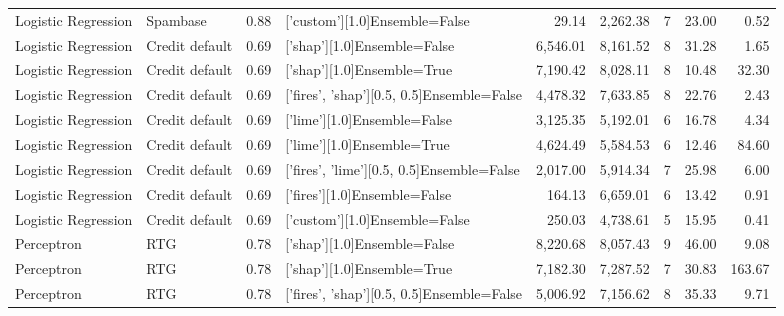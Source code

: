 \begin{tabular}{llrlrrlrr}
Logistic Regression &       Spambase &      0.88 &             ['custom'][1.0]Ensemble=False &      29.14 &                 2,262.38 &               7 &              23.00 &   0.52 \\
Logistic Regression & Credit default &      0.69 &               ['shap'][1.0]Ensemble=False &   6,546.01 &                 8,161.52 &               8 &              31.28 &   1.65 \\
Logistic Regression & Credit default &      0.69 &                ['shap'][1.0]Ensemble=True &   7,190.42 &                 8,028.11 &               8 &              10.48 &  32.30 \\
Logistic Regression & Credit default &      0.69 & ['fires', 'shap'][0.5, 0.5]Ensemble=False &   4,478.32 &                 7,633.85 &               8 &              22.76 &   2.43 \\
Logistic Regression & Credit default &      0.69 &               ['lime'][1.0]Ensemble=False &   3,125.35 &                 5,192.01 &               6 &              16.78 &   4.34 \\
Logistic Regression & Credit default &      0.69 &                ['lime'][1.0]Ensemble=True &   4,624.49 &                 5,584.53 &               6 &              12.46 &  84.60 \\
Logistic Regression & Credit default &      0.69 & ['fires', 'lime'][0.5, 0.5]Ensemble=False &   2,017.00 &                 5,914.34 &               7 &              25.98 &   6.00 \\
Logistic Regression & Credit default &      0.69 &              ['fires'][1.0]Ensemble=False &     164.13 &                 6,659.01 &               6 &              13.42 &   0.91 \\
Logistic Regression & Credit default &      0.69 &             ['custom'][1.0]Ensemble=False &     250.03 &                 4,738.61 &               5 &              15.95 &   0.41 \\
         Perceptron &            RTG &      0.78 &               ['shap'][1.0]Ensemble=False &   8,220.68 &                 8,057.43 &               9 &              46.00 &   9.08 \\
         Perceptron &            RTG &      0.78 &                ['shap'][1.0]Ensemble=True &   7,182.30 &                 7,287.52 &               7 &              30.83 & 163.67 \\
         Perceptron &            RTG &      0.78 & ['fires', 'shap'][0.5, 0.5]Ensemble=False &   5,006.92 &                 7,156.62 &               8 &              35.33 &   9.71 \\

\end{tabular}
